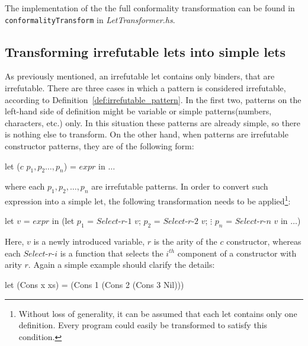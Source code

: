 \documentclass[12pt,a4paper]{report}
\begin{document}
The implementation of the the full conformality transformation can be found in
\texttt{conformalityTransform} in \textit{LetTransformer.hs}.

\subsection{Transforming irrefutable lets into simple lets}
As previously mentioned, an irrefutable let contains only binders, that are
irrefutable. There are three cases in which a pattern is considered
irrefutable, according to Definition~\ref{def:irrefutable_pattern}. In the
first two, patterns on the left-hand side of definition might be variable or
simple patterns(numbers, characters, etc.) only. In this situation these
patterns are already simple, so there is nothing else to transform. On the
other hand, when patterns are irrefutable constructor patterns, they are of the
following form:

\vspace*{0.2in}
\begin{code}[style=haskell,mathescape=true]
  let ($c$ $p_1, p_2 \ldots, p_n$) = $expr$ in $\ldots$
\end{code}

where each $p_1, p_2, \ldots, p_n$ are irrefutable patterns. In order to
convert such expression into a simple let, the following transformation needs
to be applied\footnote{Without loss of generality, it can be assumed that each
let contains only one definition. Every program could easily be transformed to
satisfy this condition.}:

\vspace*{0.2in}
\begin{code}[style=haskell,mathescape=true]
let $v$ = $expr$
in (let $p_1$ = $Select\mbox{-}r\mbox{-}1$ $v$;
        $p_2$ = $Select\mbox{-}r\mbox{-}2$ $v$;
              $\vdots$
        $p_n$ = $Select\mbox{-}r\mbox{-}n$ $v$
    in $\ldots$)
\end{code}

Here, $v$ is a newly introduced variable, $r$ is the arity of the $c$
constructor, whereas each $Select\mbox{-}r\mbox{-}i$ is a function that selects
the $i^{th}$ component of a constructor with arity $r$. Again a simple example
should clarify the details:

\vspace*{0.2in}
\begin{code}[style=haskell,mathescape=true]
let (Cons x xs) = (Cons 1 (Cons 2 (Cons 3 Nil)))
\end{code}
\end{document}
